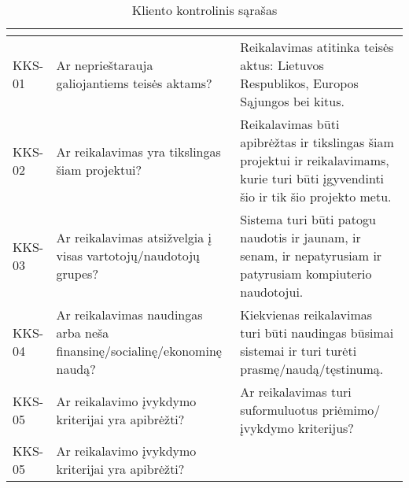 \documentclass{VUMIFPSkursinis}
\begin{document}
\begin{center}

	\begin{longtable}{|C{2cm}|L{5cm}|L{8cm}|}

		\caption{Kliento kontrolinis sąrašas}
		\label{table:KKS}

		\\ \hline
		                                              &
		                                  &
		\\ \hline
		KKS-01                                                                                       &
		Ar neprieštarauja galiojantiems teisės aktams?                                               &
		Reikalavimas atitinka teisės aktus: Lietuvos Respublikos, Europos Sąjungos bei kitus.
		\\ \hline
		KKS-02                                                                                       &
		Ar reikalavimas yra tikslingas šiam projektui?                                               &
		Reikalavimas būti apibrėžtas ir tikslingas šiam projektui ir reikalavimams, kurie turi būti įgyvendinti šio ir tik šio projekto metu.
		\\ \hline
		KKS-03                                                                                       &
		Ar reikalavimas atsižvelgia į visas vartotojų/naudotojų grupes?                              &
		Sistema turi būti patogu naudotis ir jaunam, ir senam, ir nepatyrusiam ir patyrusiam kompiuterio naudotojui.
		\\ \hline
		KKS-04                                                                                       &
		Ar reikalavimas naudingas arba neša finansinę/socialinę/ekonominę naudą?                     &
		Kiekvienas reikalavimas turi būti naudingas būsimai sistemai ir turi turėti prasmę/naudą/tęstinumą.
		\\ \hline
		KKS-05                                                                                       &
		Ar reikalavimo įvykdymo kriterijai yra apibrėžti?                                            &
		Ar reikalavimas turi suformuluotus priėmimo/įvykdymo kriterijus?
		\\ \hline
		KKS-05                                                                                       &
		Ar reikalavimo įvykdymo kriterijai yra apibrėžti?                                            &

\end{longtable}
\end{center}
\end{document}
